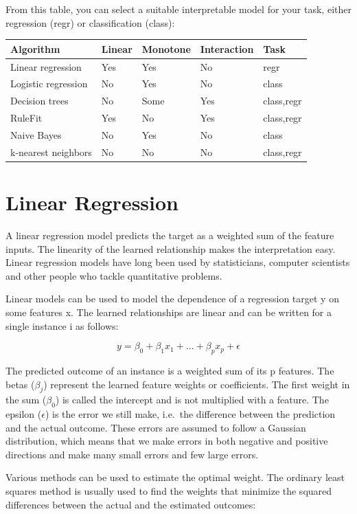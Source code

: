 \documentclass[
  12pt,
]{krantz}
\begin{document}
From this table, you can select a suitable interpretable model for your task, either regression (regr) or classification (class):

\begin{longtable}[]{@{}lllll@{}}
\toprule
Algorithm & Linear & Monotone & Interaction & Task\tabularnewline
\midrule
\endhead
Linear regression & Yes & Yes & No & regr\tabularnewline
Logistic regression & No & Yes & No & class\tabularnewline
Decision trees & No & Some & Yes & class,regr\tabularnewline
RuleFit & Yes & No & Yes & class,regr\tabularnewline
Naive Bayes & No & Yes & No & class\tabularnewline
k-nearest neighbors & No & No & No & class,regr\tabularnewline
\bottomrule
\end{longtable}

\newpage

\hypertarget{limo}{%
\section{Linear Regression}\label{limo}}

A linear regression model predicts the target as a weighted sum of the feature inputs.
The linearity of the learned relationship makes the interpretation easy.
Linear regression models have long been used by statisticians, computer scientists and other people who tackle quantitative problems.

Linear models can be used to model the dependence of a regression target y on some features x.
The learned relationships are linear and can be written for a single instance i as follows:

\[y=\beta_{0}+\beta_{1}x_{1}+\ldots+\beta_{p}x_{p}+\epsilon\]

The predicted outcome of an instance is a weighted sum of its p features.
The betas (\(\beta_{j}\)) represent the learned feature weights or coefficients.
The first weight in the sum (\(\beta_0\)) is called the intercept and is not multiplied with a feature.
The epsilon (\(\epsilon\)) is the error we still make, i.e.~the difference between the prediction and the actual outcome.
These errors are assumed to follow a Gaussian distribution, which means that we make errors in both negative and positive directions and make many small errors and few large errors.

Various methods can be used to estimate the optimal weight.
The ordinary least squares method is usually used to find the weights that minimize the squared differences between the actual and the estimated outcomes:
\end{document}
